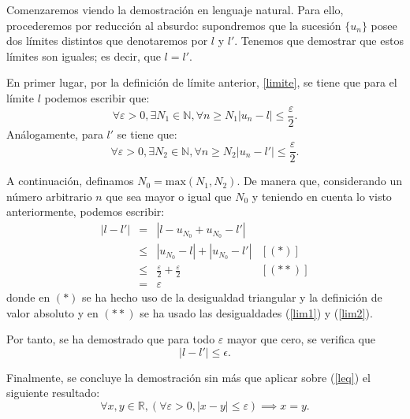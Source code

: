\begin{demostracion}
  Comenzaremos viendo la demostración en lenguaje natural. Para ello,
  procederemos por reducción al absurdo: supondremos que la sucesión
  \(\{u_n\}\) posee dos límites distintos que denotaremos por \(l\)
  y \(l'\). Tenemos que demostrar que estos límites son iguales;
  es decir, que \(l=l'\).

  En primer lugar, por la definición de límite anterior, \ref{limite},
  se tiene que para el límite \(l\) podemos escribir que:
  \begin{equation}\label{lim1}
    ∀ ε > 0, ∃ N_1 ∈ ℕ, ∀ n ≥ N_1 |u_n-l| ≤ \frac{ε}{2}.
  \end{equation}
  Análogamente, para \(l'\) se tiene que:
  \begin{equation}\label{lim2}
    ∀ ε > 0, ∃ N_2 ∈ ℕ, ∀ n ≥ N_2 |u_n-l'| ≤ \frac{ε}{2}.
  \end{equation}

  A continuación, definamos \(N_0 = \text{max} (N_1,N_2)\).
  De manera que, considerando un número arbitrario \(n\) que
  sea mayor o igual que \(N_0\) y teniendo en cuenta lo visto anteriormente,
  podemos escribir:
  \[\begin{array}{llll}
      |l-l'| &= &|l-u_{N_0}+u_{N_0}-l'|   & \\
             &≤ &|u_{N_0}-l|+|u_{N_0}-l'| & [(*)] \\
             &≤ &\frac{ε}{2}+\frac{ε}{2} & [(**)] \\
             &= &ε
  \end{array}\]
  donde en \((*)\) se ha hecho uso de la desigualdad triangular y la
  definición de valor absoluto y en \((**)\) se ha usado las
  desigualdades (\ref{lim1}) y (\ref{lim2}).

  Por tanto, se ha demostrado que para todo \(ε\) mayor que cero, se
  verifica que
  \begin{equation}\label{leq}
    |l-l'| \leq \epsilon.
  \end{equation}

  Finalmente, se concluye la demostración sin más que aplicar sobre
  (\ref{leq}) el siguiente resultado:
  \begin{equation}
    ∀ x,y ∈ ℝ,  (∀ ε > 0, |x-y| ≤ ε) ⟹ x=y.
  \end{equation}
\end{demostracion}

